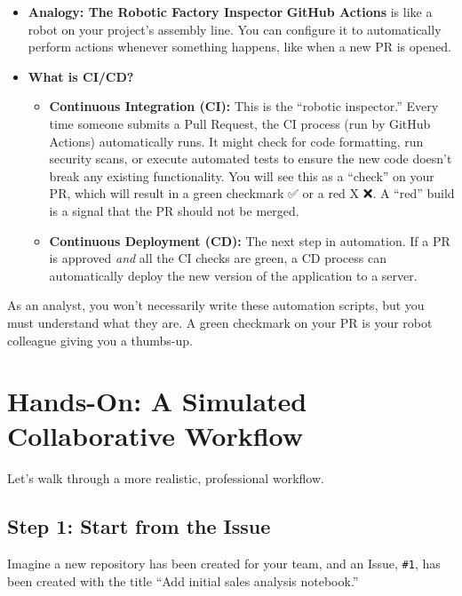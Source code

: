 \documentclass[
  letterpaper,
  DIV=11,
  numbers=noendperiod]{scrreprt}
\providecommand{\tightlist}{%
  \setlength{\itemsep}{0pt}\setlength{\parskip}{0pt}}
\begin{document}
\begin{itemize}
\tightlist
\item
  \textbf{Analogy: The Robotic Factory Inspector} \textbf{GitHub
  Actions} is like a robot on your project's assembly line. You can
  configure it to automatically perform actions whenever something
  happens, like when a new PR is opened.
\item
  \textbf{What is CI/CD?}

  \begin{itemize}
  \tightlist
  \item
    \textbf{Continuous Integration (CI):} This is the ``robotic
    inspector.'' Every time someone submits a Pull Request, the CI
    process (run by GitHub Actions) automatically runs. It might check
    for code formatting, run security scans, or execute automated tests
    to ensure the new code doesn't break any existing functionality. You
    will see this as a ``check'' on your PR, which will result in a
    green checkmark ✅ or a red X ❌. A ``red'' build is a signal that
    the PR should not be merged.
  \item
    \textbf{Continuous Deployment (CD):} The next step in automation. If
    a PR is approved \emph{and} all the CI checks are green, a CD
    process can automatically deploy the new version of the application
    to a server.
  \end{itemize}
\end{itemize}

As an analyst, you won't necessarily write these automation scripts, but
you must understand what they are. A green checkmark on your PR is your
robot colleague giving you a thumbs-up.

\section{Hands-On: A Simulated Collaborative
Workflow}\label{hands-on-a-simulated-collaborative-workflow}

Let's walk through a more realistic, professional workflow.

\subsection{Step 1: Start from the
Issue}\label{step-1-start-from-the-issue}

Imagine a new repository has been created for your team, and an Issue,
\texttt{\#1}, has been created with the title ``Add initial sales
analysis notebook.''
\end{document}
